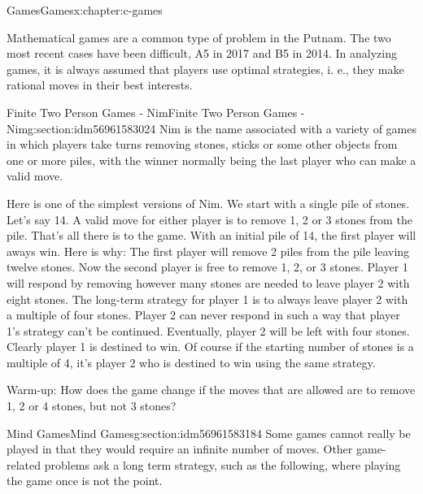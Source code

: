 \documentclass[twoside,10pt,]{book}
\numberwithin{equation}{section}
\begin{document}
\begin{chapterptx}{Games}{}{Games}{}{}{x:chapter:c-games}
\begin{introduction}{}%
Mathematical games are a common type of problem in the Putnam. The two most recent cases have been difficult, A5 in 2017 and B5 in 2014.  In analyzing games, it is  always assumed that players use optimal strategies, i. e., they make rational moves in their best interests.%
\end{introduction}%
%
%
\typeout{************************************************}
\typeout{************************************************}
%
\begin{sectionptx}{Finite Two Person Games - Nim}{}{Finite Two Person Games - Nim}{}{}{g:section:idm56961583024}
%
Nim is the name associated with a variety of games in which players take turns removing stones, sticks or some other objects from one or more piles, with the winner normally being the last player who can make a valid move.%
\par
Here is one of the simplest versions of Nim. We start with a single pile of stones. Let's say 14.  A valid move for either player is to remove 1, 2 or 3 stones from the pile. That's all there is to the game.  With an initial pile of 14, the first player will aways win.  Here is why:  The first player will remove 2 piles from the pile leaving twelve stones.   Now the second player is free to remove 1, 2, or 3 stones.  Player 1 will respond by removing however many stones are needed to leave player 2 with eight stones.  The long-term strategy for player 1 is to always leave player 2 with a multiple of four stones.   Player 2 can never respond in such a way that player 1's strategy can't be continued.  Eventually, player 2 will be left with four stones.   Clearly player 1 is destined to win.   Of course if the starting number of stones is a multiple of 4, it's player 2 who is destined to win using the same strategy.%
\par
Warm-up:  How does the game change if the moves that are allowed are to remove 1, 2 or 4 stones, but not 3 stones?%
\end{sectionptx}
%
%
\typeout{************************************************}
\typeout{************************************************}
%
\begin{sectionptx}{Mind Games}{}{Mind Games}{}{}{g:section:idm56961583184}
Some games cannot really be played in that they would require an infinite number of moves. Other game-related problems ask a long term strategy, such as the following, where playing the game once is not the point.%

\end{sectionptx}
\end{chapterptx}
\end{document}
